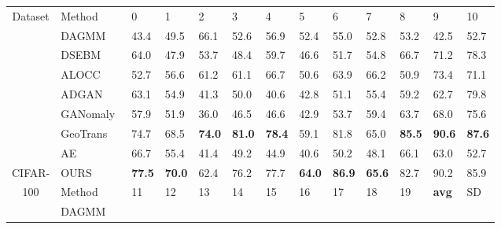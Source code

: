 \documentclass[journal]{IEEEtran}
\begin{document}
\begin{table*}[!htb]
	\begin{minipage}[t]{0.92\textwidth}
	\footnotesize
	\begin{tabular}{cx{2.0cm}x{0.7cm}x{0.7cm}x{0.7cm}x{0.7cm}x{0.7cm}x{0.7cm}x{0.7cm}x{0.7cm}x{0.7cm}x{0.7cm}x{0.8cm}}
		
		Dataset & Method & 0 & 1 & 2 & 3 & 4 & 5 & 6 & 7 & 8 & 9 & 10\\
		\cmidrule(lr){1-1} \cmidrule(lr){2-2} \cmidrule(lr){3-3} \cmidrule(lr){4-4} \cmidrule(lr){5-5} \cmidrule(lr){6-6} \cmidrule(lr){7-7} \cmidrule(lr){8-8} \cmidrule(lr){9-9} \cmidrule(lr){10-10} \cmidrule(lr){11-11} \cmidrule(lr){12-12} \cmidrule(lr){13-13}
		& DAGMM~\cite{zhai2016deep} 
		& 43.4 & 49.5 & 66.1 & 52.6 & 56.9 & 52.4 & 55.0 & 52.8 & 53.2 & 42.5 & 52.7\\
		& DSEBM~\cite{zong2018deep} 
		& 64.0 & 47.9 & 53.7 & 48.4 & 59.7 & 46.6 & 51.7 & 54.8 & 66.7 & 71.2 & 78.3 \\
		& ALOCC~\cite{Sabokrou2018Adversarially}
		& 52.7 & 56.6 & 61.2 & 61.1 & 66.7 & 50.6 & 63.9 & 66.2 & 50.9 & 73.4 & 71.1 \\
		& ADGAN~\cite{deecke2018image} 
		& 63.1 & 54.9 & 41.3 & 50.0 & 40.6 & 42.8 & 51.1 & 55.4 & 59.2 & 62.7 & 79.8 \\
		& GANomaly~\cite{Akcay2018} 
		& 57.9 & 51.9 & 36.0 & 46.5 & 46.6 & 42.9 & 53.7 & 59.4 & 63.7 & 68.0 & 75.6\\
		& GeoTrans~\cite{golan2018deep} 
		& 74.7 & 68.5 & \textbf{74.0} & \textbf{81.0} & \textbf{78.4} & 59.1 & 81.8 & 65.0 & \textbf{85.5} & \textbf{90.6} & \textbf{87.6}\\
		\cmidrule(lr){2-2} \cmidrule(lr){3-3} \cmidrule(lr){4-4} \cmidrule(lr){5-5} \cmidrule(lr){6-6} \cmidrule(lr){7-7} \cmidrule(lr){8-8} \cmidrule(lr){9-9} \cmidrule(lr){10-10} \cmidrule(lr){11-11} \cmidrule(lr){12-12} \cmidrule(lr){13-13} 
		& AE & 66.7 & 55.4 & 41.4 & 49.2 & 44.9 & 40.6 & 50.2 & 48.1 & 66.1 & 63.0 & 52.7 \\
		CIFAR-& OURS & \textbf{77.5} & \textbf{70.0} & 62.4 & 76.2 & 77.7 & \textbf{64.0} & \textbf{86.9} & \textbf{65.6} & 82.7 & 90.2 & 85.9 \\
		\cmidrule(lr){2-13}
		100 & Method & 11 & 12 & 13 & 14 & 15 & 16 & 17 & 18 & 19 & \textbf{avg} & SD\\
		\cmidrule(lr){2-2} \cmidrule(lr){3-3} \cmidrule(lr){4-4} \cmidrule(lr){5-5} \cmidrule(lr){6-6} \cmidrule(lr){7-7} \cmidrule(lr){8-8} \cmidrule(lr){9-9} \cmidrule(lr){10-10} \cmidrule(lr){11-11} \cmidrule(lr){12-12} \cmidrule(lr){13-13} 
		& DAGMM~\cite{zhai2016deep}  

\end{tabular}
\end{minipage}
\end{table*}
\end{document}
